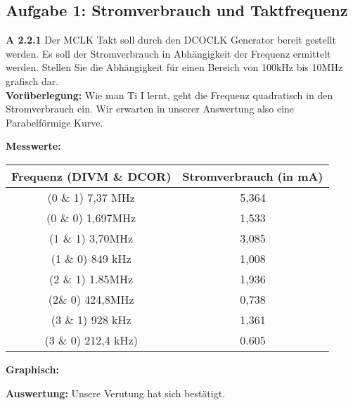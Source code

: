\subsection*{Aufgabe 1: Stromverbrauch und Taktfrequenz}

\begin{description}

\item{\bfseries A 2.2.1}  Der MCLK Takt soll durch den DCOCLK Generator bereit gestellt werden. Es soll der Stromverbrauch in Abhängigkeit der Frequenz ermittelt werden. Stellen Sie die Abhängigkeit für einen Bereich von 100kHz bis 10MHz grafisch dar.\\

\textbf{Vorüberlegung:} Wie man Ti I lernt, geht die Frequenz quadratisch in den Stromverbrauch ein. Wir erwarten in unserer Auswertung also eine Parabelförmige Kurve.

\textbf{Messwerte:}

\begin{center}
\begin{tabular}{c|c}
Frequenz (DIVM \& DCOR) & Stromverbrauch (in mA)\\
\hline
(0 \& 1)  7,37 MHz & 5,364\\
(0 \& 0) 1,697MHz & 1,533 \\
(1 \& 1) 3,70MHz & 3,085\\
(1 \& 0) 849 kHz & 1,008\\
(2 \& 1) 1.85MHz &  1,936\\
(2\& 0) 424,8MHz & 0,738\\
(3 \& 1) 928 kHz & 1,361\\
(3 \& 0) 212,4 kHz) & 0.605
\end{tabular}
\end{center}

\textbf{Graphisch:}

\textbf{Auswertung:}
Unsere Verutung hat sich bestätigt.

\end{description}
